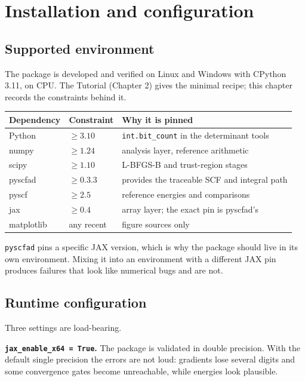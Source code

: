\chapter{Installation and configuration}
\label{ch:installation}

\section{Supported environment}

The package is developed and verified on Linux and Windows with CPython
3.11, on CPU.  The Tutorial (Chapter 2) gives the minimal recipe; this
chapter records the constraints behind it.

\begin{center}
\begin{tabular}{lll}
\toprule
Dependency & Constraint & Why it is pinned \\
\midrule
Python & $\geq 3.10$ & \texttt{int.bit\_count} in the determinant tools \\
numpy & $\geq 1.24$ & analysis layer, reference arithmetic \\
scipy & $\geq 1.10$ & L-BFGS-B and trust-region stages \\
pyscfad & $\geq 0.3.3$ & provides the traceable SCF and integral path \\
pyscf & $\geq 2.5$ & reference energies and comparisons \\
jax & $\geq 0.4$ & array layer; the exact pin is pyscfad's \\
matplotlib & any recent & figure sources only \\
\bottomrule
\end{tabular}
\end{center}

\texttt{pyscfad} pins a specific JAX version, which is why the package
should live in its own environment.  Mixing it into an environment with
a different JAX pin produces failures that look like numerical bugs and
are not.

\section{Runtime configuration}

Three settings are load-bearing.

\textbf{\texttt{jax\_enable\_x64 = True}.} The package is validated in
double precision.  With the default single precision the errors are not
loud: gradients lose several digits and some convergence gates become
unreachable, while energies look plausible.

